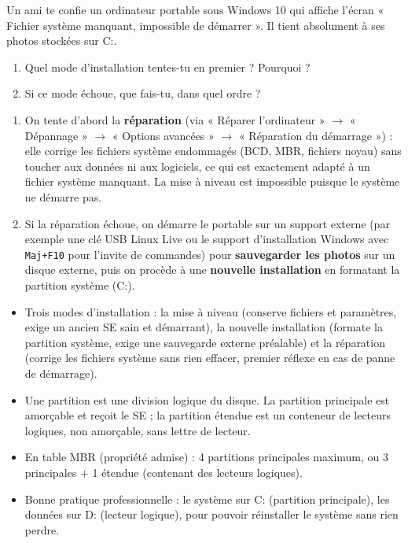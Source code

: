 \documentclass[11pt]{article}
\newcommand{\cle}[1]{{\popxbold\color{popdark}#1}}
\begin{document}
\begin{exercice}
Un ami te confie un ordinateur portable sous Windows 10 qui affiche l'écran « Fichier système manquant, impossible de démarrer ». Il tient absolument à ses photos stockées sur C:. 
\begin{enumerate}
\item Quel mode d'installation tentes-tu en premier ? Pourquoi ?
\item Si ce mode échoue, que fais-tu, dans quel ordre ?
\end{enumerate}
\end{exercice}

\begin{corrige}[Exercice]
\begin{enumerate}
\item On tente d'abord la \textbf{réparation} (via « Réparer l'ordinateur » $\rightarrow$ « Dépannage » $\rightarrow$ « Options avancées » $\rightarrow$ « Réparation du démarrage ») : elle corrige les fichiers système endommagés (BCD, MBR, fichiers noyau) sans toucher aux données ni aux logiciels, ce qui est exactement adapté à un fichier système manquant. La mise à niveau est impossible puisque le système ne démarre pas.
\item Si la réparation échoue, on démarre le portable sur un support externe (par exemple une clé USB Linux Live ou le support d'installation Windows avec \texttt{Maj+F10} pour l'invite de commandes) pour \textbf{sauvegarder les photos} sur un disque externe, puis on procède à une \textbf{nouvelle installation} en formatant la partition système (C:).
\end{enumerate}
\end{corrige}

\begin{aretenir}
\begin{itemize}
\item Trois modes d'installation : la \cle{mise à niveau} (conserve fichiers et paramètres, exige un ancien SE sain et démarrant), la \cle{nouvelle installation} (formate la partition système, exige une sauvegarde externe préalable) et la \cle{réparation} (corrige les fichiers système sans rien effacer, premier réflexe en cas de panne de démarrage).
\item Une \cle{partition} est une division logique du disque. La \cle{partition principale} est amorçable et reçoit le SE ; la \cle{partition étendue} est un conteneur de lecteurs logiques, non amorçable, sans lettre de lecteur.
\item En table \cle{MBR} (propriété admise) : 4 partitions principales maximum, ou 3 principales + 1 étendue (contenant des lecteurs logiques).
\item Bonne pratique professionnelle : le système sur C: (partition principale), les données sur D: (lecteur logique), pour pouvoir réinstaller le système sans rien perdre.
\end{itemize}
\end{aretenir}
\end{document}
